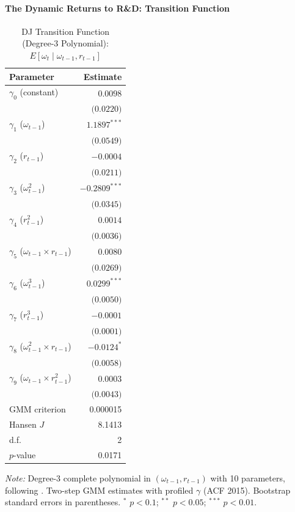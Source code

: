 \documentclass[a4paper, 12pt]{article}
\begin{document}
\paragraph{The Dynamic Returns to R\&D: \textcite{doraszelski2013r} Transition Function}

\begin{table}[htbp]
\centering
\caption{DJ Transition Function (Degree-3 Polynomial): $E[\omega_t \mid \omega_{t-1}, r_{t-1}]$}
\label{tab:dj_transition}
\begin{tabular}{lr}
\toprule
Parameter & Estimate \\
\midrule
  $\gamma_0$ (constant) & $0.0098$ \\
  & $\text{(0.0220)}$ \\
  $\gamma_1$ ($\omega_{t-1}$) & $1.1897^{***}$ \\
  & $\text{(0.0549)}$ \\
  $\gamma_2$ ($r_{t-1}$) & $-0.0004$ \\
  & $\text{(0.0211)}$ \\
  $\gamma_3$ ($\omega_{t-1}^2$) & $-0.2809^{***}$ \\
  & $\text{(0.0345)}$ \\
  $\gamma_4$ ($r_{t-1}^2$) & $0.0014$ \\
  & $\text{(0.0036)}$ \\
  $\gamma_5$ ($\omega_{t-1} \times r_{t-1}$) & $0.0080$ \\
  & $\text{(0.0269)}$ \\
  $\gamma_6$ ($\omega_{t-1}^3$) & $0.0299^{***}$ \\
  & $\text{(0.0050)}$ \\
  $\gamma_7$ ($r_{t-1}^3$) & $-0.0001$ \\
  & $\text{(0.0001)}$ \\
  $\gamma_8$ ($\omega_{t-1}^2 \times r_{t-1}$) & $-0.0124^{*}$ \\
  & $\text{(0.0058)}$ \\
  $\gamma_9$ ($\omega_{t-1} \times r_{t-1}^2$) & $0.0003$ \\
  & $\text{(0.0043)}$ \\
\midrule
GMM criterion & 0.000015 \\
Hansen $J$ & 8.1413 \\
\quad d.f. & 2 \\
\quad $p$-value & 0.0171 \\
\bottomrule
\end{tabular}
\begin{flushleft}
\footnotesize
\textit{Note:} Degree-3 complete polynomial in $(\omega_{t-1}, r_{t-1})$ with 10 parameters,
following \textcite{doraszelski2013r}.
Two-step GMM estimates with profiled $\gamma$ (ACF 2015).
Bootstrap standard errors in parentheses.
$^{*}$ $p<0.1$; $^{**}$ $p<0.05$; $^{***}$ $p<0.01$.
\end{flushleft}
\end{table}
\end{document}
